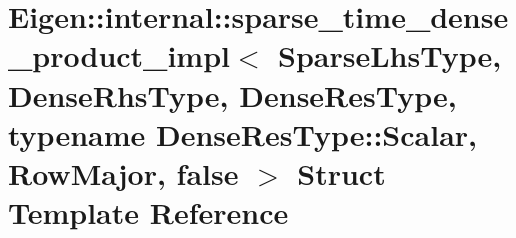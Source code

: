 \hypertarget{struct_eigen_1_1internal_1_1sparse__time__dense__product__impl_3_01_sparse_lhs_type_00_01_dense_14133348dce4820dcfa39d8f4e0ae837}{}\section{Eigen\+:\+:internal\+:\+:sparse\+\_\+time\+\_\+dense\+\_\+product\+\_\+impl$<$ Sparse\+Lhs\+Type, Dense\+Rhs\+Type, Dense\+Res\+Type, typename Dense\+Res\+Type\+:\+:Scalar, Row\+Major, false $>$ Struct Template Reference}
\label{struct_eigen_1_1internal_1_1sparse__time__dense__product__impl_3_01_sparse_lhs_type_00_01_dense_14133348dce4820dcfa39d8f4e0ae837}
